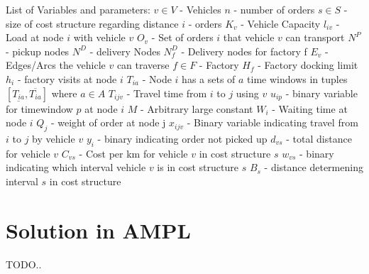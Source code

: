 \documentclass[a4paper,12pt]{article}
\begin{document}
List of Variables and parameters: \newline
$v \in V$ - Vehicles \newline
$n$ - number of orders\newline
$s \in S$ - size of cost structure regarding distance \newline
$i$ - orders\newline
$K_v$ - Vehicle Capacity \newline
$l_{iv}$ - Load at node $i$ with vehicle $v$ \newline
$O_v$ - Set of orders $i$ that vehicle $v$ can transport \newline
$N^P$ - pickup nodes\newline
$N^D$ - delivery Nodes\newline
$N^D_f$ - Delivery nodes for factory f \newline
$E_v$ - Edges/Arcs the vehicle $v$ can traverse\newline
$f \in F$ - Factory\newline
$H_f$ - Factory docking limit\newline
$h_{i}$ - factory visits at node $i$  \newline
$T_{ia}$ - Node $i$ has a sets of $a$ time windows in tuples $[ \underline{T_{ia}},  \overline{T_{ia}} ]$ where $a \in A$ \newline
$T_{ijv}$ - Travel time from $i$ to $j$ using $v$\newline
$u_{ip}$ - binary variable for timewindow $p$ at node $i$\newline
$M$ - Arbitrary large constant \newline
$W_i$ - Waiting time at node $i$ \newline
$Q_j$ - weight of order at node j \newline
$x_{ijv}$ - Binary variable indicating travel from $i$ to $j$ by vehicle $v$ \newline
$y_i$ - binary indicating order not picked up \newline
$d_{vs}$ - total distance for vehicle $v$ \newline
$C_{vs}$ - Cost per km for vehicle $v$ in cost structure $s$ \newline
$w_{vs}$ - binary indicating which interval vehicle $v$ is in cost structure $s$ \newline
$B_s$ - distance determening interval $s$ in cost structure
\section{Solution in AMPL}
TODO.. 
\end{document}
